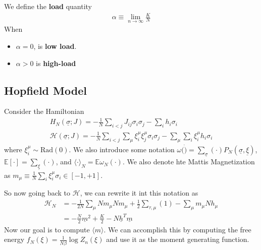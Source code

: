 \begin{definition} [Load] We define the \textbf{load} quantity
	\begin{align}
		\alpha \equiv \lim_{n \to \infty} \frac{K}{N}
	\end{align}When 
	\begin{itemize}
		\item $\alpha = 0$, is \textbf{low load}. 
		\item $\alpha > 0$ is \textbf{high-load}
	\end{itemize}
\end{definition}

\subsection{Hopfield Model} 
Consider the Hamiltonian
\begin{align}
	H_N(\underline \sigma; J) = - \frac{1}{N} \sum_{i < j} J_{ij} \sigma_i \sigma_j - \sum_i h_i \sigma_i\\
	\mathcal H (\underline \sigma; J) = - \frac{1}{N} \sum_{i < j} \sum_\mu \xi_i^\mu \xi_j^\mu \sigma_i \sigma_j - \sum_\mu \sum_i \xi_i^\mu h_i \sigma_i
\end{align}
where $\xi_i^\mu \sim \text{Rad}(0)$. We also introduce some notation $\omega(\dot) = \sum_{\underline \sigma} (\cdot) P_N(\underline \sigma, \underline \xi)$, $\mathbb E[\cdot] = \sum_{\underline \xi}(\cdot)$, and $\langle \cdot \rangle _N = \mathbb E \omega_N(\cdot)$. We also denote hte Mattis Magnetization as $m_\mu \equiv \frac{1}{N} \sum_i \xi_i^\mu \sigma_i \in [-1, +1]$.

So now going back to $\mathcal H$, we can rewrite it int this notation as
\begin{align}
	\mathcal H_N & = - \frac{1}{2N} \sum_{\mu} N m_\mu N m_\mu + \frac{1}{2} \sum_{\tau, \mu} (1) - \sum_\mu m_\mu N h_\mu\\
	& = - \frac{N}{2} \underline m^2 + \frac{K}{2} - N \underline h^T \underline m
\end{align}
Now our goal is to compute $\langle m \rangle$. We can accomplish this by computing the free energy $f_N(\xi) = \frac{1}{N\beta} \log Z_n(\xi)$ and use it as the moment generating function.






























